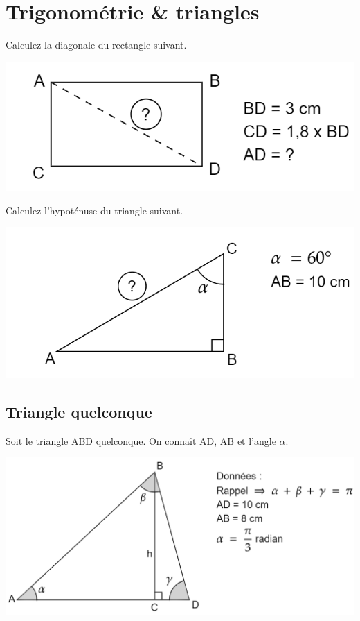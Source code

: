 \documentclass[12pt,a4paper]{article} %
\begin{document}
\section{Trigonométrie \& triangles}
\begin{exo} Calculez la diagonale du rectangle suivant.\end{exo}
\begin{center}
\includegraphics[scale=0.6]{rec1.png}
\end{center}

\begin{exo} Calculez l'hypoténuse du triangle suivant.\end{exo}
\begin{center}
\includegraphics[scale=0.6]{tri1.png}
\end{center}


\subsection*{Triangle quelconque}
Soit le triangle ABD quelconque. On connaît AD, AB et l'angle $\alpha$.
\begin{center}
\includegraphics[scale=0.5]{Q1.png}
\end{center}
\end{document}
